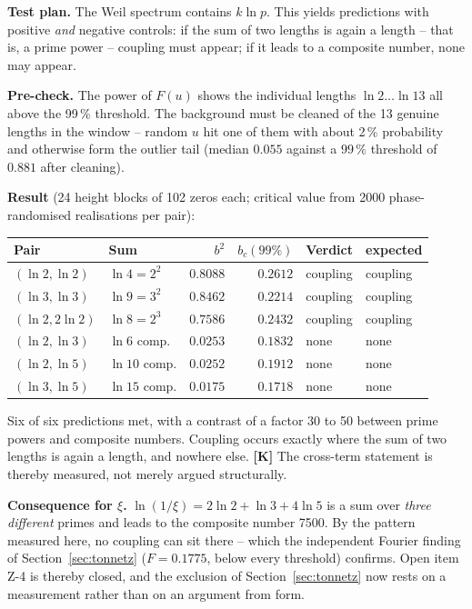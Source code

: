 \textbf{Test plan.} The Weil spectrum contains $k\ln p$. This yields
predictions with positive \emph{and} negative controls: if the sum of
two lengths is again a length -- that is, a prime power -- coupling must
appear; if it leads to a composite number, none may appear.

\textbf{Pre-check.} The power of $F(u)$ shows the individual lengths
$\ln 2 \ldots \ln 13$ all above the 99\,\% threshold. The background
must be cleaned of the 13 genuine lengths in the window -- random $u$
hit one of them with about 2\,\% probability and otherwise form the
outlier tail (median $0.055$ against a $99\,\%$ threshold of $0.881$
after cleaning).

\textbf{Result} (24 height blocks of 102 zeros each; critical value
from 2000 phase-randomised realisations per pair):

\begin{center}
\begin{tabular}{llrrll}
\toprule
Pair & Sum & $b^2$ & $b_c(99\%)$ & Verdict & expected \\
\midrule
$(\ln2,\ln2)$ & $\ln 4 = 2^2$ & $\mathbf{0.8088}$ & $0.2612$ & coupling & coupling \\
$(\ln3,\ln3)$ & $\ln 9 = 3^2$ & $\mathbf{0.8462}$ & $0.2214$ & coupling & coupling \\
$(\ln2,2\ln2)$ & $\ln 8 = 2^3$ & $\mathbf{0.7586}$ & $0.2432$ & coupling & coupling \\
$(\ln2,\ln3)$ & $\ln 6$ comp. & $0.0253$ & $0.1832$ & none & none \\
$(\ln2,\ln5)$ & $\ln 10$ comp. & $0.0252$ & $0.1912$ & none & none \\
$(\ln3,\ln5)$ & $\ln 15$ comp. & $0.0175$ & $0.1718$ & none & none \\
\bottomrule
\end{tabular}
\end{center}

\begin{keyresult}
Six of six predictions met, with a contrast of a factor 30 to 50
between prime powers and composite numbers. Coupling occurs exactly
where the sum of two lengths is again a length, and nowhere else.
\textbf{[K]} The cross-term statement is thereby measured, not merely
argued structurally.
\end{keyresult}

\textbf{Consequence for $\xi$.} $\ln(1/\xi) = 2\ln2 + \ln3 + 4\ln5$ is a
sum over \emph{three different} primes and leads to the composite
number 7500. By the pattern measured here, no coupling can sit there --
which the independent Fourier finding of Section~\ref{sec:tonnetz}
($F = 0.1775$, below every threshold) confirms. Open item Z-4 is
thereby closed, and the exclusion of Section~\ref{sec:tonnetz} now
rests on a measurement rather than on an argument from form.

